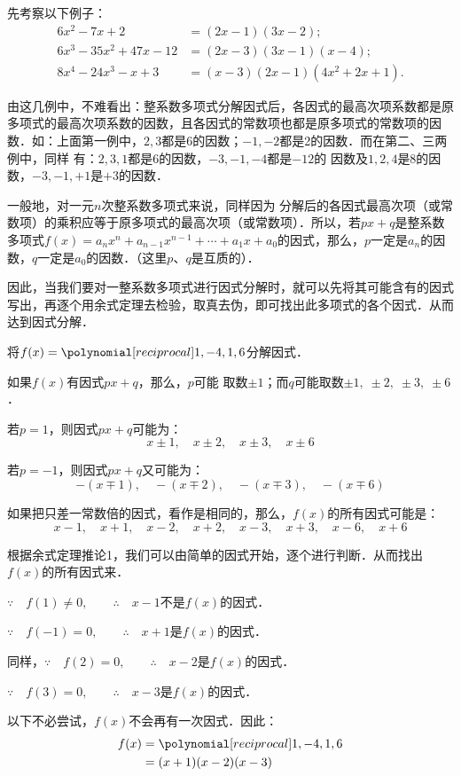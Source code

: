 先考察以下例子：
\[\begin{split}
    6x^2-7x+2&= (2x-1) (3x-2);\\
6x^3-35x^2+47x-12&= (2x-3) (3x-1)(x-4);\\
8x^4-24x^3-x+3&= (x-3) (2x-1)(4x^2+2x+1) .
\end{split}\]

由这几例中，不难看出：整系数多项式分解因式后，各因式的最高次项系数都是原多项式的最高次项系数的因数，且各因式的常数项也都是原多项式的常数项的因数．如：上面第一例中，$2, 3$都是6的因数；$-1,-2$都是2的因数．而在第二、三两例中，同样
有：$2, 3, 1$都是6的因数，$-3,-1,-4$都是$-12$的
因数及$1, 2, 4$是8的因数，$-3,-1,+1$是$+3$的因数．

一般地，对一元$n$次整系数多项式来说，同样因为
分解后的各因式最高次项（或常数项）的乘积应等于原多项式的最高次项（或常数项）．所以，若$px+q$是整系数多项式$f(x)=a_nx^n+a_{n-1}x^{n-1}+\cdots +a_1x+a_0$的因式，那么，$p$一定是$a_n$的因数，$q$一定是$a_0$的因数．（这里$p$、$q$是互质的）．

因此，当我们要对一整系数多项式进行因式分解时，就可以先将其可能含有的因式写出，再逐个用余式定理去检验，取真去伪，即可找出此多项式的各个因式．从而达到因式分解．


\begin{example}
    将$f(x)=\poly{1,-4,1,6}$分解因式．
\end{example}

\begin{analyze}
    如果$f(x)$有因式$px+q$，那么，$p$可能
取数$\pm1$；而$q$可能取数$\pm1,\;\pm2,\;\pm3,\;\pm6$．

若$p=1$，则因式$px+q$可能为：
\[x\pm1,\quad x\pm2,\quad x\pm3,\quad x\pm6\]

若$p=-1$，则因式$px+q$又可能为：
\[- (x\mp 1) ,\quad - (x\mp 2) ,\quad - (x\mp 3) ,\quad -(x\mp 6)\]

如果把只差一常数倍的因式，看作是相同的，那么，$f(x)$的所有因式可能是：
\[x-1,\quad x+1, \quad x-2,\quad x+2,\quad x-3,\quad x+3,\quad x-6,\quad x+6\]

根据余式定理推论1，我们可以由简单的因式开始，逐个进行判断．从而找出$f(x)$的所有因式来．    
\end{analyze}


\begin{solution}
$\because\quad f(1)\ne 0,\qquad \therefore\quad x-1$不是$f(x)$的因式．

$\because\quad f(-1)= 0,\qquad \therefore\quad x+1$是$f(x)$的因式．

同样，$\because\quad f(2)= 0,\qquad \therefore\quad x-2$是$f(x)$的因式．

$\because\quad f(3)= 0,\qquad \therefore\quad x-3$是$f(x)$的因式．

以下不必尝试，$f(x)$不会再有一次因式．因此：
\[\begin{split}
 f(x)&=\poly{1,-4,1,6}\\
 &=(x+1)(x-2)(x-3)   
\end{split}\]
\end{solution}


